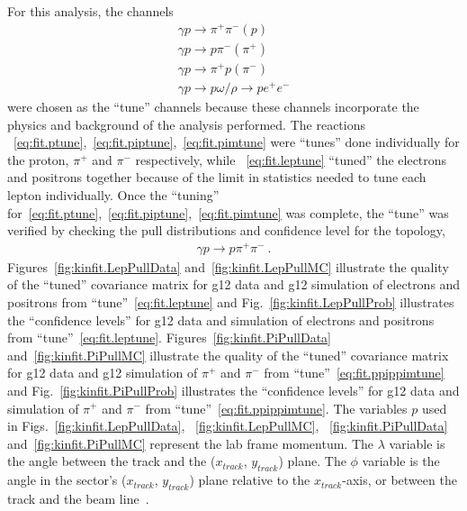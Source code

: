 For this analysis, the channels
\begin{align}
\gamma p \rightarrow \pi^+ \pi^- (p) \label{eq:fit.ptune}\\
\gamma p \rightarrow p \pi^- (\pi^+) \label{eq:fit.piptune}\\
\gamma p \rightarrow \pi^+ p (\pi^-) \label{eq:fit.pimtune}\\
\gamma p \rightarrow p \omega/\rho \rightarrow p e^+ e^- \label{eq:fit.leptune}
\end{align}
%
were chosen as the ``tune'' channels because these channels incorporate the physics and background of the analysis performed. The reactions ~\ref{eq:fit.ptune},~\ref{eq:fit.piptune},~\ref{eq:fit.pimtune} were ``tunes'' done individually for the proton, $\pi^+$ and $\pi^-$ respectively, while ~\ref{eq:fit.leptune} ``tuned'' the electrons and positrons together because of the limit in statistics needed to tune each lepton individually. Once the ``tuning'' for~\ref{eq:fit.ptune},~\ref{eq:fit.piptune},~\ref{eq:fit.pimtune} was complete, the ``tune'' was verified by checking the pull distributions and confidence level for the topology,
\begin{align}
\gamma p \rightarrow p \pi^+ \pi^- \label{eq:fit.ppippimtune} \ .
\end{align}
Figures~\ref{fig:kinfit.LepPullData} and~\ref{fig:kinfit.LepPullMC} illustrate the quality of the ``tuned'' covariance matrix for g12 data and g12 simulation of electrons and positrons from ``tune''~\ref{eq:fit.leptune} and Fig.~\ref{fig:kinfit.LepPullProb} illustrates the ``confidence levels'' for g12 data and simulation of electrons and positrons from ``tune''~\ref{eq:fit.leptune}. Figures~\ref{fig:kinfit.PiPullData} and~\ref{fig:kinfit.PiPullMC} illustrate the quality of the ``tuned'' covariance matrix for g12 data and g12 simulation of $\pi^+$ and $\pi^-$ from ``tune''~\ref{eq:fit.ppippimtune} and Fig.~\ref{fig:kinfit.PiPullProb} illustrates the ``confidence levels'' for g12 data and simulation of $\pi^+$ and $\pi^-$ from ``tune''~\ref{eq:fit.ppippimtune}. The variables $p$ used in Figs.~\ref{fig:kinfit.LepPullData}, ~\ref{fig:kinfit.LepPullMC}, ~\ref{fig:kinfit.PiPullData} and~\ref{fig:kinfit.PiPullMC} represent the lab frame momentum. The $\lambda$ variable is the angle between the track and the ($x_{track}$, $y_{track}$) plane. The $\phi$ variable is the angle in the sector's ($x_{track}$, $y_{track}$) plane relative to the $x_{track}$-axis, or between the track and the beam line~\cite{dustin.kinfit}.

